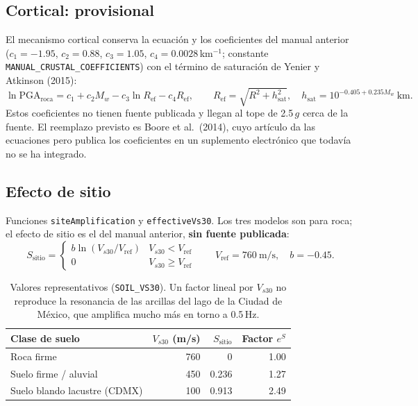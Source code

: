 \documentclass[11pt,a4paper]{article}
\begin{document}
\subsection{Cortical: provisional}
\label{sec:cortical}
El mecanismo cortical conserva la ecuación y los coeficientes del manual anterior
($c_1 = -1.95$, $c_2 = 0.88$, $c_3 = 1.05$, $c_4 = 0.0028$\,km$^{-1}$; constante
\texttt{MANUAL\_CRUSTAL\_COEFFICIENTS}) con el término de saturación de Yenier y Atkinson (2015):
\begin{equation}
  \ln \mathrm{PGA}_{\mathrm{roca}} = c_1 + c_2 M_w - c_3 \ln R_{\mathrm{ef}} - c_4 R_{\mathrm{ef}},
  \qquad R_{\mathrm{ef}} = \sqrt{R^2 + h_{\mathrm{sat}}^2},\quad h_{\mathrm{sat}} = 10^{-0.405 + 0.235 M_w}\ \text{km}.
\end{equation}
Estos coeficientes no tienen fuente publicada y llegan al tope de 2.5\,$g$ cerca de la fuente. El
reemplazo previsto es Boore et al.\ (2014), cuyo artículo da las ecuaciones pero publica los
coeficientes en un suplemento electrónico que todavía no se ha integrado.

\subsection{Efecto de sitio}
Funciones \texttt{siteAmplification} y \texttt{effectiveVs30}. Los tres modelos son para roca; el
efecto de sitio es el del manual anterior, \textbf{sin fuente publicada}:
\begin{equation}
  S_{\mathrm{sitio}} =
  \begin{cases}
    b \ln\!\left(V_{s30}/V_{\mathrm{ref}}\right) & V_{s30} < V_{\mathrm{ref}}\\
    0 & V_{s30} \ge V_{\mathrm{ref}}
  \end{cases}
  \qquad V_{\mathrm{ref}} = 760\ \text{m/s},\quad b = -0.45 .
\end{equation}

\begin{table}[h]
\centering
\begin{tabular}{lrrr}
\toprule
Clase de suelo & $V_{s30}$ (m/s) & $S_{\mathrm{sitio}}$ & Factor $e^{S}$ \\
\midrule
Roca firme & 760 & 0 & 1.00 \\
Suelo firme / aluvial & 450 & 0.236 & 1.27 \\
Suelo blando lacustre (CDMX) & 100 & 0.913 & 2.49 \\
\bottomrule
\end{tabular}
\caption{Valores representativos (\texttt{SOIL\_VS30}). Un factor lineal por $V_{s30}$ no reproduce la
resonancia de las arcillas del lago de la Ciudad de México, que amplifica mucho más en torno a
0.5\,Hz.}
\end{table}
\end{document}
